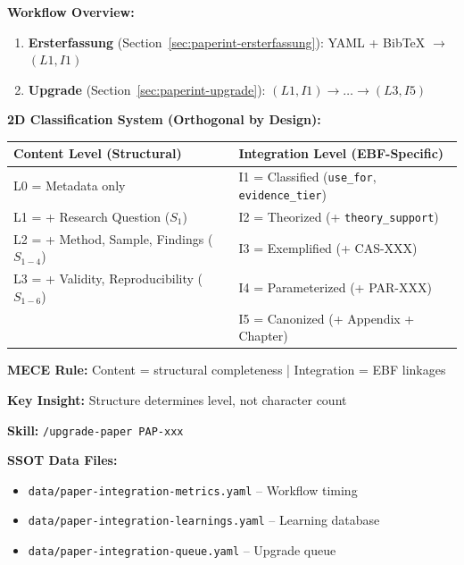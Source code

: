 \begin{tcolorbox}[colback=blue!5!white, colframe=blue!75!black,
    title=Quick Reference: Paper Integration (MECE-Compliant)]

\textbf{Workflow Overview:}
\begin{enumerate}[nosep]
    \item \textbf{Ersterfassung} (Section~\ref{sec:paperint-ersterfassung}): YAML + BibTeX $\rightarrow$ $(L1, I1)$
    \item \textbf{Upgrade} (Section~\ref{sec:paperint-upgrade}): $(L1, I1) \rightarrow \ldots \rightarrow (L3, I5)$
\end{enumerate}

\vspace{0.3em}
\textbf{2D Classification System (Orthogonal by Design):}

\begin{tabular}{@{}p{4.5cm}|p{5.5cm}@{}}
\textbf{Content Level (Structural)} & \textbf{Integration Level (EBF-Specific)} \\
\midrule
L0 = Metadata only & I1 = Classified (\texttt{use\_for}, \texttt{evidence\_tier}) \\
L1 = + Research Question ($S_1$) & I2 = Theorized (+ \texttt{theory\_support}) \\
L2 = + Method, Sample, Findings ($S_{1-4}$) & I3 = Exemplified (+ CAS-XXX) \\
L3 = + Validity, Reproducibility ($S_{1-6}$) & I4 = Parameterized (+ PAR-XXX) \\
 & I5 = Canonized (+ Appendix + Chapter) \\
\end{tabular}

\vspace{0.3em}
\textbf{MECE Rule:} Content = structural completeness | Integration = EBF linkages

\textbf{Key Insight:} Structure determines level, not character count

\textbf{Skill:} \texttt{/upgrade-paper PAP-xxx}

\textbf{SSOT Data Files:}
\begin{itemize}[nosep]
    \item \texttt{data/paper-integration-metrics.yaml} -- Workflow timing
    \item \texttt{data/paper-integration-learnings.yaml} -- Learning database
    \item \texttt{data/paper-integration-queue.yaml} -- Upgrade queue
\end{itemize}

\end{tcolorbox}

